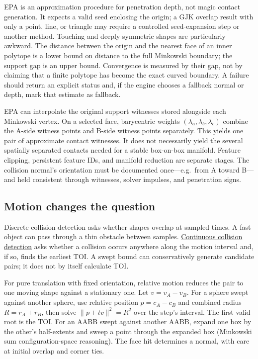 EPA is an approximation procedure for penetration depth, not magic contact generation. It expects a valid seed enclosing the origin; a GJK overlap result with only a point, line, or triangle may require a controlled seed-expansion step or another method. Touching and deeply symmetric shapes are particularly awkward. The distance between the origin and the nearest face of an inner polytope is a lower bound on distance to the full Minkowski boundary; the support gap is an upper bound. Convergence is measured by their gap, not by claiming that a finite polytope has become the exact curved boundary. A failure should return an explicit status and, if the engine chooses a fallback normal or depth, mark that estimate as fallback.

EPA can interpolate the original support witnesses stored alongside each Minkowski vertex. On a selected face, barycentric weights \((\lambda_a,\lambda_b,\lambda_c)\) combine the A-side witness points and B-side witness points separately. This yields one pair of approximate contact witnesses. It does not necessarily yield the several spatially separated contacts needed for a stable box-on-box manifold. Feature clipping, persistent feature IDs, and manifold reduction are separate stages. The collision normal's orientation must be documented once---e.g.~from A toward B---and held consistent through witnesses, solver impulses, and penetration signs.

\subsection{Motion changes the question}\label{03-visual-computing-i-ch020-motion-changes-the-question}

Discrete collision detection asks whether shapes overlap at sampled times. A fast object can pass through a thin obstacle between samples. \hyperref[appendix-66956ed6c753]{Continuous collision detection} asks whether a collision occurs anywhere along the motion interval and, if so, finds the earliest TOI. A swept bound can conservatively generate candidate pairs; it does not by itself calculate TOI.

For pure translation with fixed orientation, relative motion reduces the pair to one moving shape against a stationary one. Let \(v=v_A-v_B\). For a sphere swept against another sphere, use relative position \(p=c_A-c_B\) and combined radius \(R=r_A+r_B\), then solve \(\|p+tv\|^2=R^2\) over the step's interval. The first valid root is the TOI. For an AABB swept against another AABB, expand one box by the other's half-extents and sweep a point through the expanded box (Minkowski sum configuration-space reasoning). The face hit determines a normal, with care at initial overlap and corner ties.

